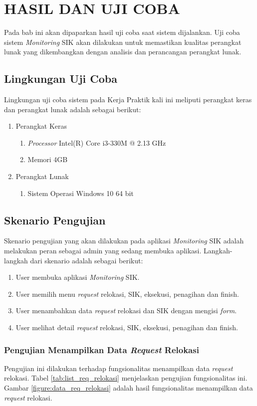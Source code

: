 \chapter{HASIL DAN UJI COBA}
Pada bab ini akan dipaparkan hasil uji coba saat sistem dijalankan. Uji coba sistem \textit{Monitoring} SIK akan dilakukan untuk memastikan kualitas perangkat lunak yang dikembangkan dengan analisis dan perancangan perangkat lunak.
\section{Lingkungan Uji Coba}
Lingkungan uji coba sistem pada Kerja Praktik kali ini meliputi perangkat keras dan perangkat lunak adalah sebagai berikut:
\begin{enumerate}
\item Perangkat Keras
	\begin{enumerate}
	\item \textit{Processor} Intel(R) Core i3-330M @ 2.13 GHz
	\item Memori 4GB
	\end{enumerate}
\item Perangkat Lunak
	\begin{enumerate}
	\item Sistem Operasi Windows 10 64 bit
	\end{enumerate}
\end{enumerate}

\section{Skenario Pengujian}
Skenario pengujian yang akan dilakukan pada aplikasi \textit{Monitoring} SIK adalah melakukan peran sebagai admin yang sedang membuka aplikasi. Langkah-langkah dari skenario adalah sebagai berikut:
	\begin{enumerate}
	\item User membuka aplikasi \textit{Monitoring} SIK.
	\item User memilih menu \textit{request} relokasi, SIK, eksekusi, penagihan dan finish.
	\item User menambahkan data \textit{request} relokasi dan SIK dengan mengisi \textit{form}.
	\item User melihat detail \textit{request} relokasi, SIK, eksekusi, penagihan dan finish.
	\end{enumerate}
\subsection{Pengujian Menampilkan Data \textit{Request} Relokasi}
Pengujian ini dilakukan terhadap fungsionalitas menampilkan data \textit{request} relokasi. Tabel \ref{tab:list_req_relokasi} menjelaskan pengujian fungsionalitas ini. Gambar \ref{figure:data_req_relokasi} adalah hasil fungsionalitas menampilkan data \textit{request} relokasi.

